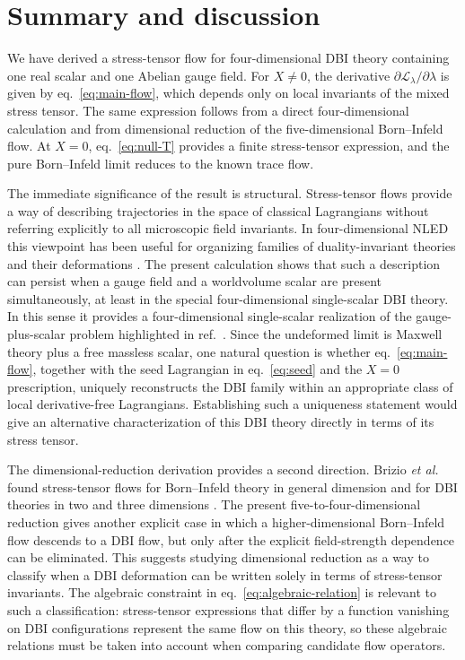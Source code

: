 \documentclass[a4paper,11pt]{article}
\numberwithin{equation}{section}
\newcommand{\Lag}{\mathcal L}
\begin{document}
\section{Summary and discussion}
\label{sec:discussion}

We have derived a stress-tensor flow for four-dimensional DBI theory containing one real scalar and one Abelian gauge field. For $X\neq0$, the derivative $\partial\Lag_\lambda/\partial\lambda$ is given by eq.~\eqref{eq:main-flow}, which depends only on local invariants of the mixed stress tensor. The same expression follows from a direct four-dimensional calculation and from dimensional reduction of the five-dimensional Born--Infeld flow. At $X=0$, eq.~\eqref{eq:null-T} provides a finite stress-tensor expression, and the pure Born--Infeld limit reduces to the known trace flow.

The immediate significance of the result is structural. Stress-tensor flows provide a way of describing trajectories in the space of classical Lagrangians without referring explicitly to all microscopic field invariants. In four-dimensional NLED this viewpoint has been useful for organizing families of duality-invariant theories and their deformations \cite{Ferko2023Duality,Ferko2023Birefringence}. The present calculation shows that such a description can persist when a gauge field and a worldvolume scalar are present simultaneously, at least in the special four-dimensional single-scalar DBI theory. In this sense it provides a four-dimensional single-scalar realization of the gauge-plus-scalar problem highlighted in ref.~\cite{Ferko2024DBI}. Since the undeformed limit is Maxwell theory plus a free massless scalar, one natural question is whether eq.~\eqref{eq:main-flow}, together with the seed Lagrangian in eq.~\eqref{eq:seed} and the $X=0$ prescription, uniquely reconstructs the DBI family within an appropriate class of local derivative-free Lagrangians. Establishing such a uniqueness statement would give an alternative characterization of this DBI theory directly in terms of its stress tensor.

The dimensional-reduction derivation provides a second direction. Brizio \textit{et al.} found stress-tensor flows for Born--Infeld theory in general dimension and for DBI theories in two and three dimensions \cite{Brizio2026}. The present five-to-four-dimensional reduction gives another explicit case in which a higher-dimensional Born--Infeld flow descends to a DBI flow, but only after the explicit field-strength dependence can be eliminated. This suggests studying dimensional reduction as a way to classify when a DBI deformation can be written solely in terms of stress-tensor invariants. The algebraic constraint in eq.~\eqref{eq:algebraic-relation} is relevant to such a classification: stress-tensor expressions that differ by a function vanishing on DBI configurations represent the same flow on this theory, so these algebraic relations must be taken into account when comparing candidate flow operators.
\end{document}
